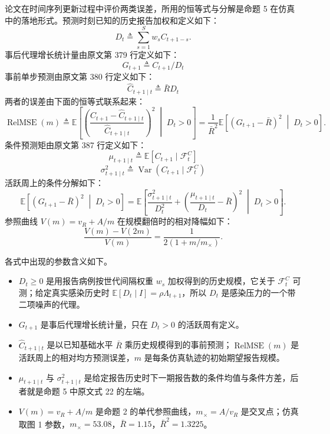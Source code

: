 论文在时间序列更新过程中评价两类误差，所用的恒等式与分解是命题 5 在仿真中的落地形式。预测时刻已知的历史报告加权和定义如下：
\begin{equation*}
D_t \triangleq \sum_{s=1}^S w_s C_{t+1-s}.
\tag{原文式 26}
\end{equation*}
事后代理增长统计量由原文第 379 行定义如下：
\begin{equation*}
G_{t+1} \triangleq C_{t+1}/D_t
\tag*{原文第 379 行}
\end{equation*}
事前单步预测由原文第 380 行定义如下：
\begin{equation*}
\widehat{C}_{t+1 \mid t} \triangleq \bar{R} D_t
\tag*{原文第 380 行}
\end{equation*}
两者的误差由下面的恒等式联系起来：
\begin{equation*}
\operatorname{RelMSE}(m) \triangleq \mathbb{E}\left[\left(\frac{C_{t+1} - \widehat{C}_{t+1 \mid t}}{\widehat{C}_{t+1 \mid t}}\right)^2 \;\middle|\; D_t > 0\right] = \frac{1}{\bar{R}^2}\mathbb{E}\left[(G_{t+1} - \bar{R})^2 \;\middle|\; D_t > 0\right].
\tag{原文式 27}
\end{equation*}
条件预测矩由原文第 387 行定义如下：
\begin{equation*}
\mu_{t+1 \mid t} \triangleq \mathbb{E}[C_{t+1} \mid \mathcal{F}_t^C]
\tag*{原文第 387 行}
\end{equation*}
\begin{equation*}
\sigma_{t+1 \mid t}^2 \triangleq \operatorname{Var}(C_{t+1} \mid \mathcal{F}_t^C)
\tag*{原文第 387 行}
\end{equation*}
活跃周上的条件分解如下：
\begin{equation*}
\mathbb{E}\left[(G_{t+1} - \bar{R})^2 \;\middle|\; D_t > 0\right] = \mathbb{E}\left[\frac{\sigma_{t+1 \mid t}^2}{D_t^2} + \left(\frac{\mu_{t+1 \mid t}}{D_t} - \bar{R}\right)^2 \;\middle|\; D_t > 0\right].
\tag{原文式 28}
\end{equation*}
参照曲线 $V(m)=v_R+A/m$ 在规模翻倍时的相对降幅如下：
\begin{equation*}
\frac{V(m) - V(2m)}{V(m)} = \frac{1}{2(1 + m/m_\times)}.
\tag{原文式 29}
\end{equation*}

各式中出现的参数含义如下。
\begin{itemize}
\item $D_t\ge0$ 是用报告病例按世代间隔权重 $w_s$ 加权得到的历史规模，它关于 $\mathcal F_t^C$ 可测；给定真实感染历史时 $\mathbb E[D_t\mid I]=\rho\Lambda_{t+1}$，所以 $D_t$ 是感染压力的一个带二项噪声的代理。
\item $G_{t+1}$ 是事后代理增长统计量，只在 $D_t>0$ 的活跃周有定义。
\item $\widehat C_{t+1\mid t}$ 是以已知基础水平 $\bar R$ 乘历史规模得到的事前预测；$\operatorname{RelMSE}(m)$ 是活跃周上的相对均方预测误差，$m$ 是每条仿真轨迹的初始期望报告规模。
\item $\mu_{t+1\mid t}$ 与 $\sigma^2_{t+1\mid t}$ 是给定报告历史时下一期报告数的条件均值与条件方差，后者就是命题 5 中原文式 22 的左端。
\item $V(m)=v_R+A/m$ 是命题 2 的单代参照曲线，$m_\times=A/v_R$ 是交叉点；仿真取图 1 参数，$m_\times=53.08$，$\bar R=1.15$，$\bar R^2=1.3225$。
\end{itemize}

